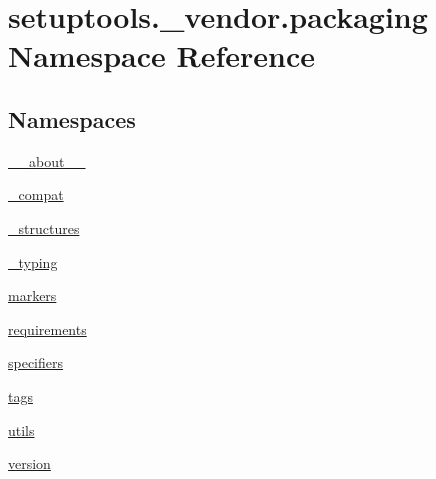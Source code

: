 \hypertarget{namespacesetuptools_1_1__vendor_1_1packaging}{}\section{setuptools.\+\_\+vendor.\+packaging Namespace Reference}
\label{namespacesetuptools_1_1__vendor_1_1packaging}
\subsection*{Namespaces}
\begin{DoxyCompactItemize}
\item 
 \hyperlink{namespacesetuptools_1_1__vendor_1_1packaging_1_1____about____}{\+\_\+\+\_\+about\+\_\+\+\_\+}
\item 
 \hyperlink{namespacesetuptools_1_1__vendor_1_1packaging_1_1__compat}{\+\_\+compat}
\item 
 \hyperlink{namespacesetuptools_1_1__vendor_1_1packaging_1_1__structures}{\+\_\+structures}
\item 
 \hyperlink{namespacesetuptools_1_1__vendor_1_1packaging_1_1__typing}{\+\_\+typing}
\item 
 \hyperlink{namespacesetuptools_1_1__vendor_1_1packaging_1_1markers}{markers}
\item 
 \hyperlink{namespacesetuptools_1_1__vendor_1_1packaging_1_1requirements}{requirements}
\item 
 \hyperlink{namespacesetuptools_1_1__vendor_1_1packaging_1_1specifiers}{specifiers}
\item 
 \hyperlink{namespacesetuptools_1_1__vendor_1_1packaging_1_1tags}{tags}
\item 
 \hyperlink{namespacesetuptools_1_1__vendor_1_1packaging_1_1utils}{utils}
\item 
 \hyperlink{namespacesetuptools_1_1__vendor_1_1packaging_1_1version}{version}
\end{DoxyCompactItemize}
